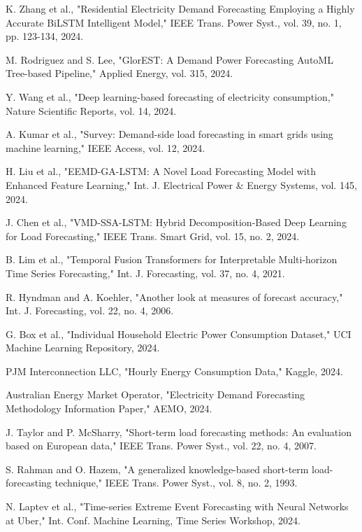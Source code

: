 \documentclass[12pt,a4paper]{report}
\begin{document}
\begin{thebibliography}{99}
 K. Zhang et al., "Residential Electricity Demand Forecasting Employing a Highly Accurate BiLSTM Intelligent Model," IEEE Trans. Power Syst., vol. 39, no. 1, pp. 123-134, 2024.

 M. Rodriguez and S. Lee, "GlorEST: A Demand Power Forecasting AutoML Tree-based Pipeline," Applied Energy, vol. 315, 2024.

 Y. Wang et al., "Deep learning-based forecasting of electricity consumption," Nature Scientific Reports, vol. 14, 2024.

 A. Kumar et al., "Survey: Demand-side load forecasting in smart grids using machine learning," IEEE Access, vol. 12, 2024.

 H. Liu et al., "EEMD-GA-LSTM: A Novel Load Forecasting Model with Enhanced Feature Learning," Int. J. Electrical Power & Energy Systems, vol. 145, 2024.

 J. Chen et al., "VMD-SSA-LSTM: Hybrid Decomposition-Based Deep Learning for Load Forecasting," IEEE Trans. Smart Grid, vol. 15, no. 2, 2024.

 B. Lim et al., "Temporal Fusion Transformers for Interpretable Multi-horizon Time Series Forecasting," Int. J. Forecasting, vol. 37, no. 4, 2021.

 R. Hyndman and A. Koehler, "Another look at measures of forecast accuracy," Int. J. Forecasting, vol. 22, no. 4, 2006.

 G. Box et al., "Individual Household Electric Power Consumption Dataset," UCI Machine Learning Repository, 2024.

 PJM Interconnection LLC, "Hourly Energy Consumption Data," Kaggle, 2024.

 Australian Energy Market Operator, "Electricity Demand Forecasting Methodology Information Paper," AEMO, 2024.

 J. Taylor and P. McSharry, "Short-term load forecasting methods: An evaluation based on European data," IEEE Trans. Power Syst., vol. 22, no. 4, 2007.

 S. Rahman and O. Hazem, "A generalized knowledge-based short-term load-forecasting technique," IEEE Trans. Power Syst., vol. 8, no. 2, 1993.

 N. Laptev et al., "Time-series Extreme Event Forecasting with Neural Networks at Uber," Int. Conf. Machine Learning, Time Series Workshop, 2024.

\end{thebibliography}
\end{document}
